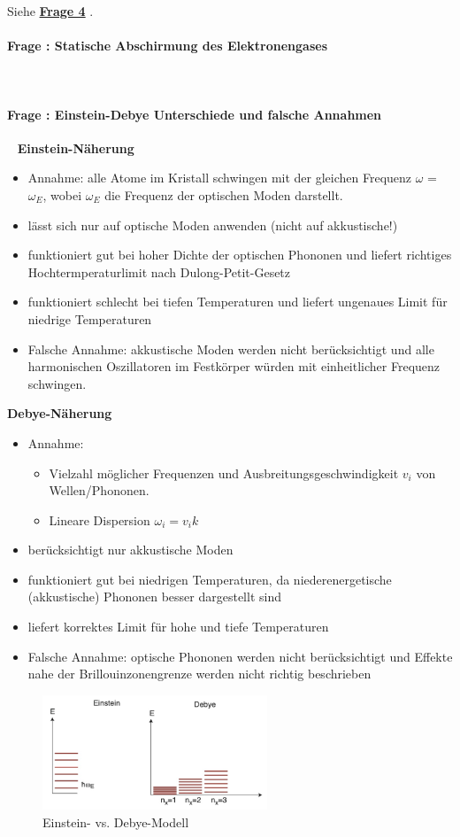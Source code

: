 \documentclass[a4paper, 11pt, ngerman, parskip=half-]{scrartcl}
\newcounter{question}
\newcommand{\question}[1]{\stepcounter{question}\paragraph{Frage \thequestion: #1}~}
\newcommand{\aqref}[1]{%
  \phantomsection\label{q:#1}%
  \textbf{\hyperref[q:#1]{Frage #1}}%
}
\begin{document}
Siehe \aqref{4}.

\question{Statische Abschirmung des Elektronengases}
\label{q:39}

\question{Einstein-Debye Unterschiede und falsche Annahmen}
\label{q:40}
\textbf{Einstein-Näherung} 
\begin{itemize}
    \item Annahme: alle Atome im Kristall schwingen mit der gleichen Frequenz $\omega$ = $\omega_E$, wobei $\omega_E$ die Frequenz der optischen Moden darstellt. 
    \item lässt sich nur auf optische Moden anwenden (nicht auf akkustische!)
    \item funktioniert gut bei hoher Dichte der optischen Phononen und liefert richtiges 
    Hochtermperaturlimit nach Dulong-Petit-Gesetz
    \item funktioniert schlecht bei tiefen Temperaturen und liefert ungenaues Limit für niedrige Temperaturen
    \item Falsche Annahme: akkustische Moden werden nicht berücksichtigt und alle harmonischen Oszillatoren im Festkörper würden mit einheitlicher Frequenz schwingen.
\end{itemize}

\textbf{Debye-Näherung} 
\begin{itemize}
    \item Annahme: 
        \begin{itemize}
            \item Vielzahl möglicher Frequenzen und Ausbreitungsgeschwindigkeit $v_i$ von Wellen/Phononen. 
            \item Lineare Dispersion $\omega_i=v_ik$ 
        \end{itemize}
    \item berücksichtigt nur akkustische Moden
    \item funktioniert gut bei niedrigen Temperaturen, da niederenergetische (akkustische) Phononen besser dargestellt sind 
    \item liefert korrektes Limit für hohe und tiefe Temperaturen
    \item Falsche Annahme: optische Phononen werden nicht berücksichtigt und Effekte nahe der Brillouinzonengrenze werden nicht richtig beschrieben
\end{itemize}

\begin{figure}[H]
 \centering
 \includegraphics[width=0.6\textwidth]{resources/15-06-2015/Einstein_Debye.jpeg}
 \caption{Einstein- vs. Debye-Modell}
\end{figure}
\newpage
\end{document}
